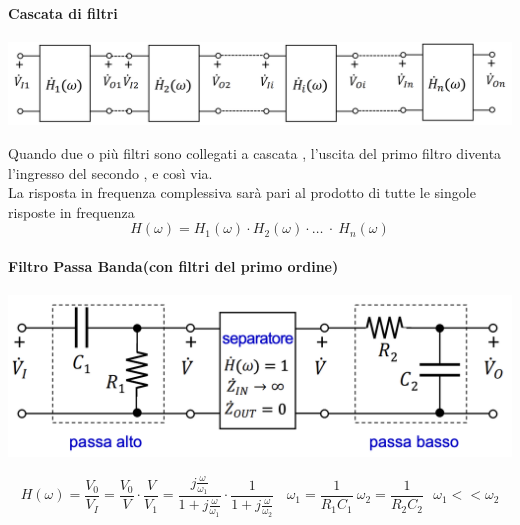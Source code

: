 \documentclass{article}
\theoremstyle{definition}
\begin{document}
\paragraph{Cascata di filtri}
\begin{center}
\includegraphics[scale=0.40]{immagini/cascata}
\end{center}
	Quando due o più filtri sono collegati a cascata , l'uscita del primo filtro diventa l'ingresso del secondo , e così via.\\La risposta in frequenza complessiva sarà pari al prodotto di tutte le singole risposte in frequenza 
	$$H(\omega)=H_1(\omega)\cdot H_2(\omega) 	\cdot \dots\ \cdot \ H_n(\omega)$$
\paragraph{Filtro Passa Banda(con filtri del primo ordine)}
\begin{center}
\includegraphics[scale=0.60]{immagini/passa banda}
\end{center}
$$H(\omega)=\frac{V_0}{V_I}=\frac{V_0}{V}\cdot \frac{V}{V_1}=\frac{j\frac{\omega}{ \omega_1}}{1+j\frac{\omega}{\omega_1}}\cdot\frac{1}{1+j\frac{\omega}{\omega_2}}\ \ \ \ \omega_1=\frac{1}{R_1 C_1} \ \omega_2=\frac{1}{R_2C_2} \ \ \ \omega_1 <<\omega_2$$
\end{document}
